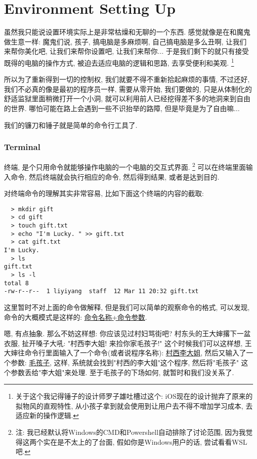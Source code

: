 \chapter{Environment Setting Up}


虽然我只能说设置环境实际上是非常枯燥和无聊的一个东西. 感觉就像是在和魔鬼做生意一样: 魔鬼们说, 孩子, 搞电脑是多麻烦啊, 自己搞电脑是多么丑啊, 让我们来帮你美化吧, 让我们来帮你设置吧, 让我们来帮你... 于是我们剩下的就只有接受既得的电脑的操作方式, 被迫去适应电脑的逻辑和思路, 去享受便利和美观. \footnote{关于这个我记得锤子的设计师罗子雄吐槽过这个: iOS现在的设计抛弃了原来的拟物风的直观特性, 从小孩子拿到就会使用到让用户去不得不增加学习成本, 去适应新的操作逻辑. }

所以为了重新得到一切的控制权, 我们就要不得不重新拾起麻烦的事情, 不过还好, 我们不必真的像是最初的程序员一样, 需要从零开始, 我们要做的, 只是从体制化的舒适监狱里面稍微打开一个小洞, 就可以利用前人已经挖得差不多的地洞来到自由的世界. 哪怕可能在路上会遇到一些不识抬举的路障, 但是毕竟是为了自由嘛...

我们的镰刀和锤子就是简单的命令行工具了. 

\subsection*{Terminal}
终端, 是个只用命令就能够操作电脑的一个电脑的交互式界面. 
\footnote{注: 我已经默认将Windows的CMD和Powershell自动排除了讨论范围, 因为我觉得这两个实在是不太上的了台面, 假如你是Windows用户的话, 尝试看看WSL吧. }
可以在终端里面输入命令, 然后终端就会执行相应的命令, 然后得到结果, 
或者是达到目的. 

对终端命令的理解其实非常容易, 比如下面这个终端的内容的截取: 

\begin{lstlisting}
  > mkdir gift
  > cd gift
  > touch gift.txt
  > echo "I'm Lucky. " >> gift.txt
  > cat gift.txt
I'm Lucky. 
  > ls
gift.txt
  > ls -l
total 8
-rw-r--r--  1 liyiyang  staff  12 Mar 11 20:32 gift.txt
\end{lstlisting}

这里暂时不对上面的命令做解释, 但是我们可以简单的观察命令的格式, 
可以发现, 命令的大概模式是这样的: \underline{命令名称+命令参数}. 

嗯, 有点抽象. 那么不妨这样想: 你应该见过村妇骂街吧? 
村东头的王大婶撂下一盆衣服, 扯开嗓子大吼: "村西李大姐! 
来捡你家毛孩子!" 这个时候我们可以这样想, 
王大婶往命令行里面输入了一个命令(或者说程序名称): 
\underline{村西李大姐}, 然后又输入了一个参数: \underline{毛孩子}, 
这样, 系统就会找到"村西的李大姐"这个程序, 然后将"毛孩子"
这个参数丢给"李大姐"来处理. 至于毛孩子的下场如何, 就暂时和我们没关系了. 

